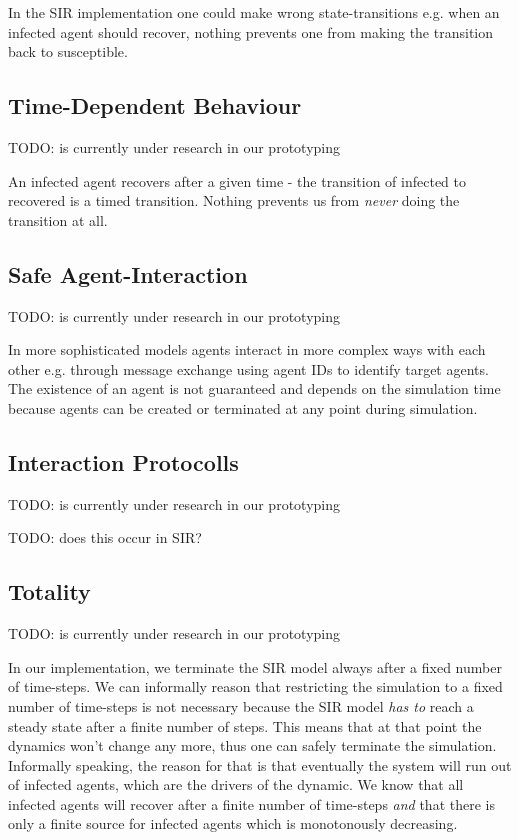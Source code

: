 In the SIR implementation one could make wrong state-transitions e.g. when an infected agent should recover, nothing prevents one from making the transition back to susceptible. 
	
\subsection{Time-Dependent Behaviour}
TODO: is currently under research in our prototyping

An infected agent recovers after a given time - the transition of infected to recovered is a timed transition. Nothing prevents us from \textit{never} doing the transition at all. 
	
\subsection{Safe Agent-Interaction}
TODO: is currently under research in our prototyping

In more sophisticated models agents interact in more complex ways with each other e.g. through message exchange using agent IDs to identify target agents. The existence of an agent is not guaranteed and depends on the simulation time because agents can be created or terminated at any point during simulation. 

\subsection{Interaction Protocolls}
TODO: is currently under research in our prototyping

TODO: does this occur in SIR?
	
\subsection{Totality}
TODO: is currently under research in our prototyping

In our implementation, we terminate the SIR model always after a fixed number of time-steps. We can informally reason that restricting the simulation to a fixed number of time-steps is not necessary because the SIR model \textit{has to} reach a steady state after a finite number of steps. This means that at that point the dynamics won't change any more, thus one can safely terminate the simulation. Informally speaking, the reason for that is that eventually the system will run out of infected agents, which are the drivers of the dynamic. We know that all infected agents will recover after a finite number of time-steps \textit{and} that there is only a finite source for infected agents which is monotonously decreasing. 

